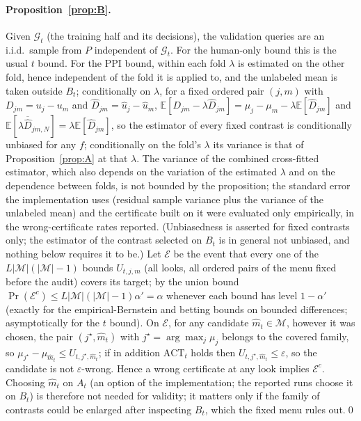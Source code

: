 \documentclass{article}
\newcommand{\eps}{\varepsilon}
\newcommand{\ACT}{\mathrm{ACT}}
\begin{document}
\paragraph{Proposition~\ref{prop:B}.} Given $\mathcal G_t$ (the training half and its decisions), the validation queries are an i.i.d.\ sample from $P$ independent of $\mathcal G_t$. For the human-only bound this is the usual $t$ bound. For the PPI bound, within each fold $\lambda$ is estimated on the other fold, hence independent of the fold it is applied to, and the unlabeled mean is taken outside $B_t$; conditionally on $\lambda$, for a fixed ordered pair $(j,m)$ with $D_{jm}=u_j-u_m$ and $\hat D_{jm}=\hat u_j-\hat u_m$, $\mathbb E[D_{jm}-\lambda\hat D_{jm}]=\mu_j-\mu_m-\lambda\mathbb E[\hat D_{jm}]$ and $\mathbb E[\lambda\overline{\hat D}_{jm,N}]=\lambda\mathbb E[\hat D_{jm}]$, so the estimator of every fixed contrast is conditionally unbiased for any $f$; conditionally on the fold's $\lambda$ its variance is that of Proposition~\ref{prop:A} at that $\lambda$. The variance of the combined cross-fitted estimator, which also depends on the variation of the estimated $\lambda$ and on the dependence between folds, is not bounded by the proposition; the standard error the implementation uses (residual sample variance plus the variance of the unlabeled mean) and the certificate built on it were evaluated only empirically, in the wrong-certificate rates reported. (Unbiasedness is asserted for fixed contrasts only; the estimator of the contrast selected on $B_t$ is in general not unbiased, and nothing below requires it to be.) Let $\mathcal E$ be the event that every one of the $L|\mathcal M|(|\mathcal M|-1)$ bounds $U_{t,j,m}$ (all looks, all ordered pairs of the menu fixed before the audit) covers its target; by the union bound $\Pr(\mathcal E^c)\le L|\mathcal M|(|\mathcal M|-1)\alpha'=\alpha$ whenever each bound has level $1-\alpha'$ (exactly for the empirical-Bernstein \citep{maurer2009eb} and betting bounds on bounded differences; asymptotically for the $t$ bound). On $\mathcal E$, for any candidate $\hat m_t\in\mathcal M$, however it was chosen, the pair $(j^\star,\hat m_t)$ with $j^\star=\arg\max_j\mu_j$ belongs to the covered family, so $\mu_{j^\star}-\mu_{\hat m_t}\le U_{t,j^\star,\hat m_t}$; if in addition $\ACT_t$ holds then $U_{t,j^\star,\hat m_t}\le\eps$, so the candidate is not $\eps$-wrong. Hence a wrong certificate at any look implies $\mathcal E^c$. Choosing $\hat m_t$ on $A_t$ (an option of the implementation; the reported runs choose it on $B_t$) is therefore not needed for validity; it matters only if the family of contrasts could be enlarged after inspecting $B_t$, which the fixed menu rules out.\qed
\end{document}
